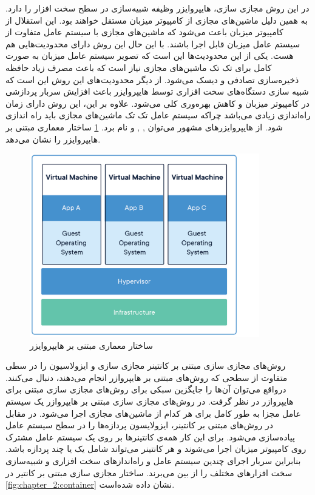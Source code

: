       در این روش مجازی سازی، {هایپروایزر} وظیفه شبیه‌سازی در سطح سخت افزار را دارد.
      به همین دلیل ماشین‌های مجازی از کامپیوتر میزبان مستقل خواهند بود.
      این استقلال از کامپیوتر میزبان باعث می‌شود که ماشین‌های مجازی با سیستم عامل متفاوت از سیستم عامل میزبان قابل اجرا باشند\cite{morabito2015hypervisors}.
      با این حال این روش دارای محدودیت‌هایی هم هست.
      یکی از این محدودیت‌ها این است که تصویر سیستم عامل میزبان به صورت کامل برای تک تک ماشین‌های مجازی نیاز است که باعث مصرف زیاد حافظه ذخیره‌سازی تصادفی و دیسک می‌شود.
      از دیگر محدودیت‌های این روش این است که شبیه سازی دستگاه‌های سخت افزاری توسط {هایپروایزر}  باعث افزایش سربار پردازشی در کامپیوتر میزبان و کاهش بهره‌وری کلی می‌شود.
      علاوه بر این، این روش دارای زمان راه‌اندازی زیادی می‌باشد چراکه سیستم عامل تک تک ماشین‌های مجازی باید راه اندازی شود.
      از {هایپروایزر}های مشهور می‌توان , ,  و  نام برد.
      \cref{fig:chapter_2:vm} ساختار معماری مبتنی بر {هایپروایزر} را نشان می‌دهد.

      \begin{figure}[]
        \centerline{\includegraphics[width=10cm]{graphics/chapter_2/vm}}
        \caption{ساختار معماری مبتنی بر {هایپروایزر} \cite{2018are}}
        \label{fig:chapter_2:vm}
      \end{figure}

      روش‌های مجازی سازی مبتنی بر کانتینر مجازی سازی و ایزولاسیون را در سطی متفاوت از سطحی که روش‌های مبتنی بر {هایپروازر} انجام می‌دهند، دنبال می‌کنند.
      درواقع می‌توان آن‌ها را جایگزین سبکی برای روش‌های مجازی سازی مبتنی برای {هایپروازر} در نظر گرفت.
      در روش‌های مجازی سازی مبتنی بر {هایپروازر} یک سیستم عامل مجزا به طور کامل برای هر کدام از ماشین‌های مجازی اجرا می‌شود.
      در مقابل در روش‌های مبتنی بر کانتینر، ایزولایسون پردازه‌ها را در سطح سیستم عامل پیاده‌سازی می‌شود.
      برای این کار همه‌ی کانتینر‌ها بر روی یک سیستم عامل مشترک روی کامپیوتر میزبان اجرا می‌شوند و هر کانتینر می‌تواند شامل یک یا چند پردازه باشد.
      بنابراین سربار اجرای چندین سیستم عامل و راه‌انداز‌های سخت افزاری و شبیه‌سازی سخت افزار‌های مختلف را از بین می‌برند.
      ساختار مجازی سازی مبتنی بر کانتیر در \cref{fig:chapter_2:container} نشان داده شده‌است.
            
